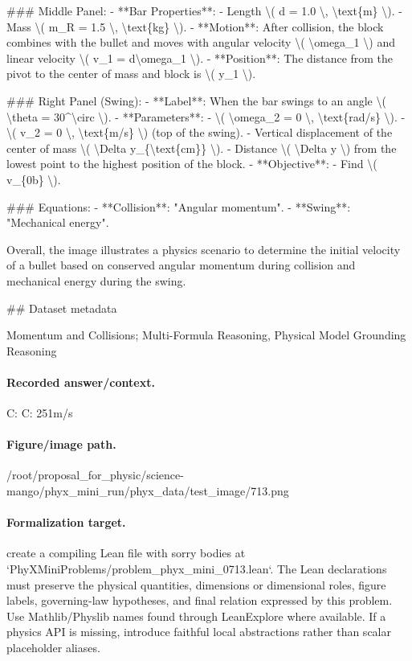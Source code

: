 \#\#\# Middle Panel:
- **Bar Properties**:
  - Length \textbackslash{}( d = 1.0 \textbackslash{}, \textbackslash{}text\{m\} \textbackslash{}).
  - Mass \textbackslash{}( m\_R = 1.5 \textbackslash{}, \textbackslash{}text\{kg\} \textbackslash{}).
- **Motion**: After collision, the block combines with the bullet and moves with angular velocity \textbackslash{}( \textbackslash{}omega\_1 \textbackslash{}) and linear velocity \textbackslash{}( v\_1 = d\textbackslash{}omega\_1 \textbackslash{}).
- **Position**: The distance from the pivot to the center of mass and block is \textbackslash{}( y\_1 \textbackslash{}).

\#\#\# Right Panel (Swing):
- **Label**: When the bar swings to an angle \textbackslash{}( \textbackslash{}theta = 30\textasciicircum{}\textbackslash{}circ \textbackslash{}).
- **Parameters**:
  - \textbackslash{}( \textbackslash{}omega\_2 = 0 \textbackslash{}, \textbackslash{}text\{rad/s\} \textbackslash{}).
  - \textbackslash{}( v\_2 = 0 \textbackslash{}, \textbackslash{}text\{m/s\} \textbackslash{}) (top of the swing).
  - Vertical displacement of the center of mass \textbackslash{}( \textbackslash{}Delta y\_\{\textbackslash{}text\{cm\}\} \textbackslash{}).
  - Distance \textbackslash{}( \textbackslash{}Delta y \textbackslash{}) from the lowest point to the highest position of the block.
- **Objective**: 
  - Find \textbackslash{}( v\_\{0b\} \textbackslash{}).

\#\#\# Equations:
- **Collision**: "Angular momentum".
- **Swing**: "Mechanical energy".

Overall, the image illustrates a physics scenario to determine the initial velocity of a bullet based on conserved angular momentum during collision and mechanical energy during the swing.

\#\# Dataset metadata

Momentum and Collisions; Multi-Formula Reasoning, Physical Model Grounding Reasoning

\paragraph{Recorded answer/context.}
C: C: 251m/s

\paragraph{Figure/image path.}
/root/proposal\_for\_physic/science-mango/phyx\_mini\_run/phyx\_data/test\_image/713.png

\paragraph{Formalization target.}
create a compiling Lean file with sorry bodies at `PhyXMiniProblems/problem\_phyx\_mini\_0713.lean`. The Lean declarations must preserve the physical quantities, dimensions or dimensional roles, figure labels, governing-law hypotheses, and final relation expressed by this problem.
Use Mathlib/Physlib names found through LeanExplore where available. If a physics API is missing, introduce faithful local abstractions rather than scalar placeholder aliases.


